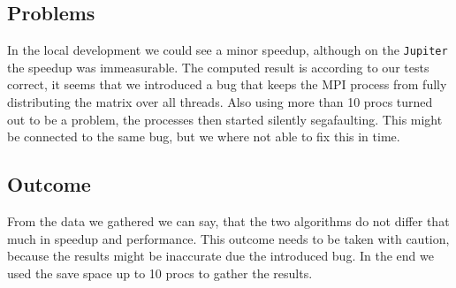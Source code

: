 \subsection{Problems}

In the local development we could see a minor speedup, although on the \texttt{Jupiter} the speedup was immeasurable.
The computed result is according to our tests correct, it seems that we introduced a bug that keeps the MPI process from fully distributing the matrix over all threads.
Also using more than 10 procs turned out to be a problem, the processes then started silently segafaulting.
This might be connected to the same bug, but we where not able to fix this in time.


\subsection{Outcome}

From the data we gathered we can say, that the two algorithms do not differ that much in speedup and performance.
This outcome needs to be taken with caution, because the results might be inaccurate due the introduced bug.
In the end we used the save space up to 10 procs to gather the results.



\AllgatherFixedProcs
{}\ReduceScatterFixedProcs



